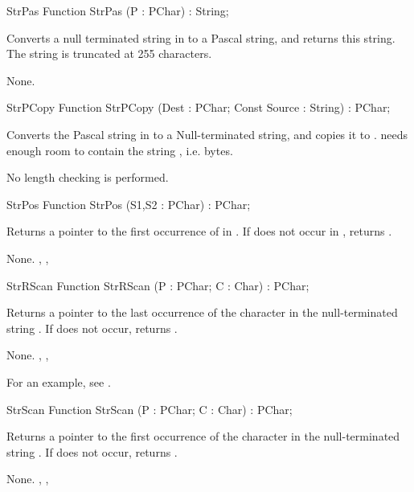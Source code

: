 \latex{}
\html{}
\begin{function}{StrPas}
\Declaration
Function StrPas (P : PChar) : String;

\Description

Converts a null terminated string in  to a Pascal string, and returns
this string. The string is truncated at 255 characters.

\Errors
None.
\SeeAlso
\end{function}
\latex{}
\html{}
\begin{function}{StrPCopy}
\Declaration
Function StrPCopy (Dest : PChar; Const Source : String) : PChar;

\Description

Converts the Pascal string in  to a Null-terminated 
string, and copies it to .  needs enough room to contain
the string , i.e.  bytes.

\Errors
No length checking is performed.
\SeeAlso
\end{function}
\latex{}
\html{}
\begin{function}{StrPos}
\Declaration
Function StrPos (S1,S2 : PChar) : PChar;

\Description

Returns a pointer to the first occurrence of  in .
If  does not occur in , returns .

\Errors
None.
\SeeAlso
{}, , 
\end{function}
\latex{}
\html{}
\begin{function}{StrRScan}
\Declaration
Function StrRScan (P : PChar; C : Char) : PChar;

\Description

Returns a pointer to the last occurrence of the character  in the
null-terminated string . If  does not occur, returns
.

\Errors
None.
\SeeAlso
{}, , 
\end{function}
For an example, see .
\begin{function}{StrScan}
\Declaration
Function StrScan (P : PChar; C : Char) : PChar;

\Description

Returns a pointer to the first occurrence of the character  in the
null-terminated string . If  does not occur, returns
.

\Errors
None.
\SeeAlso
{}, , 
\end{function}
